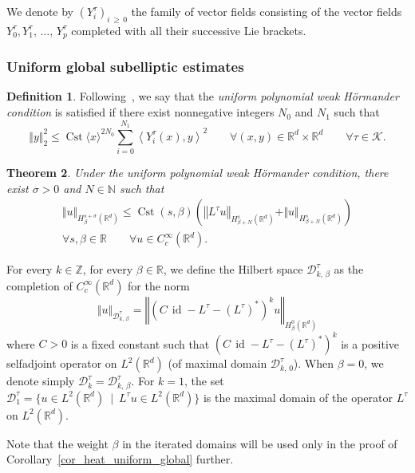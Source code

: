\documentclass[10pt]{amsart}
\newtheorem{theo}{Theorem}[section]
\theoremstyle{definition}\newtheorem{defi}[theo]{Definition}\newtheorem{rema}[theo]{Remark}\newtheorem{exam}[theo]{Example}\newtheorem{exem}[theo]{Example}\newtheorem{nota}[theo]{Notation}
\newcommand*\R{\mathbb{R}}
\newcommand*\N{\mathbb{N}}
\newcommand*\Z{\mathbb{Z}}
\newcommand{\calK}{\mathcal{K}}
\newcommand{\calD}{\mathcal{D}}
\DeclareMathOperator{\Cst}{Cst}
\DeclareMathOperator{\id}{id}
\renewcommand{\geq}{\geqslant}
\renewcommand{\leq}{\leqslant}
\let\oldforall\forall
\renewcommand*{\forall}{\mathrel{\oldforall}}
\begin{document}
We denote by $(Y_i^\tau)_{i\,\geq\,0}$ the family of vector fields consisting of the vector fields $Y_0^\tau,Y_1^\tau,\,\ldots,\,Y_p^\tau$ completed with all their successive Lie brackets.


\subsubsection{Uniform global subelliptic estimates}\label{sec:uniform_global_subelliptic_estimates}
\begin{defi}
Following~\cite{EckmannHairer}, we say that the \emph{uniform polynomial weak H\"ormander condition} is satisfied if there exist nonnegative integers $N_0$ and $N_1$ such that
\begin{equation}\label{UPH_nondegen}
\Vert y\Vert_2^2 \leq \Cst \langle x\rangle^{2N_0} \sum_{i=0}^{N_1} \left\langle Y_i^\tau(x),y\right\rangle^2
\qquad \forall(x,y)\in\R^d\times\R^d\qquad\forall\tau\in\calK.
\end{equation}
\end{defi}

\begin{theo}\label{thm_subelliptic_uniform_global}
Under the uniform polynomial weak H\"ormander condition, there exist $\sigma>0$ and $N\in\N$ such that
\begin{multline*}
\Vert u\Vert_{H^{s+\sigma}_\beta\left(\R^d\right)} \leq \Cst(s,\beta) \left(\left\Vert L^\tau u\right\Vert_{H^s_{\beta+N}\left(\R^d\right)} + \Vert u\Vert_{H^s_{\beta+N}\left(\R^d\right)} \right) \\
\forall s,\beta\in\R \qquad \forall u\in C_c^\infty\left(\R^d\right).
\end{multline*}
\end{theo}

For every $k\in\Z$, for every $\beta\in\R$, we define the Hilbert space $\calD^\tau_{k,\,\beta}$ as the completion of $C_c^\infty(\R^d)$ for the norm
\[
\Vert u\Vert_{\calD^\tau_{k,\,\beta}} = \left\Vert \left(C\,\id - L^\tau - (L^\tau)^*\right)^k u\right\Vert_{H^0_\beta\left(\R^d\right)}
\]
where $C>0$ is a fixed constant such that $(C\,\id - L^\tau - (L^\tau)^*)^k$ is a positive selfadjoint operator on $L^2(\R^d)$ (of maximal domain $\calD^\tau_{k,\,0}$). When $\beta=0$, we denote simply $\calD^\tau_k=\calD^\tau_{k,\,\beta}$. For $k=1$, the set $\calD^\tau_1=\{ u\in L^2(\R^d)\ \mid\ L^\tau u\in L^2(\R^d)\}$ is the maximal domain of the operator $L^\tau$ on $L^2(\R^d)$.

Note that the weight $\beta$ in the iterated domains will be used only in the proof of Corollary~\ref{cor_heat_uniform_global} further.
\end{document}
